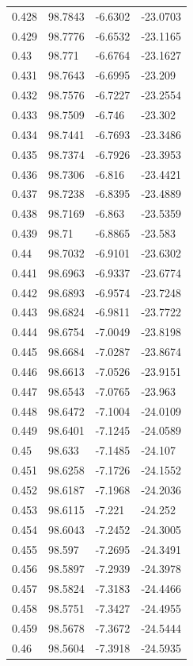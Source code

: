 \begin{tabular}{llll}
0.428 & 98.7843 & -6.6302 & -23.0703 \\
0.429 & 98.7776 & -6.6532 & -23.1165 \\
0.43 & 98.771 & -6.6764 & -23.1627 \\
0.431 & 98.7643 & -6.6995 & -23.209 \\
0.432 & 98.7576 & -6.7227 & -23.2554 \\
0.433 & 98.7509 & -6.746 & -23.302 \\
0.434 & 98.7441 & -6.7693 & -23.3486 \\
0.435 & 98.7374 & -6.7926 & -23.3953 \\
0.436 & 98.7306 & -6.816 & -23.4421 \\
0.437 & 98.7238 & -6.8395 & -23.4889 \\
0.438 & 98.7169 & -6.863 & -23.5359 \\
0.439 & 98.71 & -6.8865 & -23.583 \\
0.44 & 98.7032 & -6.9101 & -23.6302 \\
0.441 & 98.6963 & -6.9337 & -23.6774 \\
0.442 & 98.6893 & -6.9574 & -23.7248 \\
0.443 & 98.6824 & -6.9811 & -23.7722 \\
0.444 & 98.6754 & -7.0049 & -23.8198 \\
0.445 & 98.6684 & -7.0287 & -23.8674 \\
0.446 & 98.6613 & -7.0526 & -23.9151 \\
0.447 & 98.6543 & -7.0765 & -23.963 \\
0.448 & 98.6472 & -7.1004 & -24.0109 \\
0.449 & 98.6401 & -7.1245 & -24.0589 \\
0.45 & 98.633 & -7.1485 & -24.107 \\
0.451 & 98.6258 & -7.1726 & -24.1552 \\
0.452 & 98.6187 & -7.1968 & -24.2036 \\
0.453 & 98.6115 & -7.221 & -24.252 \\
0.454 & 98.6043 & -7.2452 & -24.3005 \\
0.455 & 98.597 & -7.2695 & -24.3491 \\
0.456 & 98.5897 & -7.2939 & -24.3978 \\
0.457 & 98.5824 & -7.3183 & -24.4466 \\
0.458 & 98.5751 & -7.3427 & -24.4955 \\
0.459 & 98.5678 & -7.3672 & -24.5444 \\
0.46 & 98.5604 & -7.3918 & -24.5935 \\

\end{tabular}
